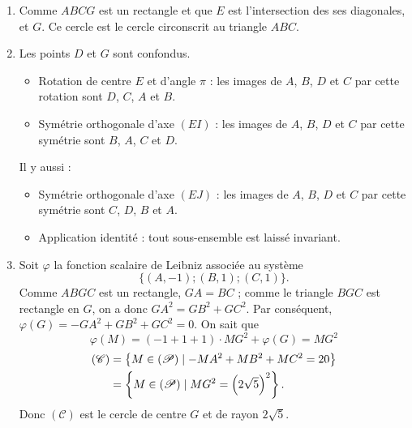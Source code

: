 \begin{description}
\begin{enumerate}
\begin{enumerate}
								Comme $ABGC$ est un rectangle, alors $AG = BC$.
								Le triangle $ABC$ \'etant rectangle en $A$, d'apr\`es le th\'eor\`eme de Pythagore :
									$BC^2 = AB^2 + AC^2$.
								Ainsi, $AG = BC = \sqrt{AB^2 + AC^2} = \sqrt{8^2 + 4^2}$, d'o\`u .
					\item {}
								Comme $ABCG$ est un rectangle et que $E$ est l'intersection des ses diagonales,
								 et $G$.
								Ce cercle est le cercle circonscrit au triangle $ABC$.
					\item {}
								Les points $D$ et $G$ sont confondus.
							
							 \vspace{-1\baselineskip}
								\begin{itemize}
									\item Rotation de centre $E$ et d'angle $\pi$ : 
										les images de $A$, $B$, $D$ et $C$ par cette rotation sont $D$, $C$, $A$ et $B$.
									\item Sym\'etrie orthogonale d'axe $(EI)$ :
										les images de $A$, $B$, $D$ et $C$ par cette sym\'etrie sont $B$, $A$, $C$ et $D$.
								\end{itemize}
								{\color{loko3}
								Il y aussi :
								\begin{itemize}
									\item Sym\'etrie orthogonale d'axe $(EJ)$ :
										les images de $A$, $B$, $D$ et $C$ par cette sym\'etrie sont $C$, $D$, $B$ et $A$.
									\item Application identit\'e :
										tout sous-ensemble est laiss\'e invariant.
								\end{itemize}
								}
						\item {}
							Soit $\varphi$ la fonction scalaire de Leibniz associ\'ee au syst\`eme
							\[
							\{(A,-1);(B,1);(C,1)\}.
							\]
							Comme $ABGC$ est un rectangle, $GA=BC$ ; comme le triangle $BGC$ est rectangle en $G$,
							on a donc $GA^2=GB^2+GC^2$.
						Par cons\'equent, $\varphi(G) = -GA^2 + GB^2 + GC^2 = 0$.
						On sait que
						\[
							\varphi(M)	 = (-1+1+1) \cdot MG^2 + \varphi(G)
											 = MG^2										
						\]
						\begin{align*}
								(\mathscr{C})	& = \left\{ M \in (\mathscr{P}) \mid -MA^2 + MB^2 + MC^2 = 20 \right\}					\\
												& = \left\{ M \in (\mathscr{P}) \mid MG^2 = \left( 2\sqrt{5} \right)^2 \right\}		.
						\end{align*}
						Donc $(\mathscr{C})$ est le cercle de centre $G$ et de rayon $2\sqrt{5}$.


\end{enumerate}
\end{enumerate}
\end{description}
